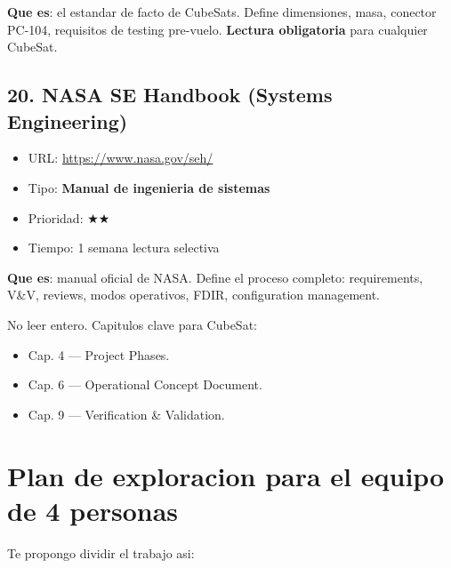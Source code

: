 \documentclass[11pt,a4paper,oneside]{report}
\begin{document}
\textbf{Que es}: el estandar de facto de CubeSats. Define dimensiones,
masa, conector PC-104, requisitos de testing pre-vuelo. \textbf{Lectura
obligatoria} para cualquier CubeSat.

\section{20. NASA SE Handbook (Systems Engineering)}

\begin{itemize}[leftmargin=1.5em]
  \item URL: \url{https://www.nasa.gov/seh/}
  \item Tipo: \textbf{Manual de ingenieria de sistemas}
  \item Prioridad: $\bigstar\bigstar$
  \item Tiempo: 1 semana lectura selectiva
\end{itemize}

\textbf{Que es}: manual oficial de NASA. Define el proceso completo:
requirements, V\&V, reviews, modos operativos, FDIR, configuration
management.

\begin{nota}
No leer entero. Capitulos clave para CubeSat:
\begin{itemize}[leftmargin=1em]
  \item Cap. 4 --- Project Phases.
  \item Cap. 6 --- Operational Concept Document.
  \item Cap. 9 --- Verification \& Validation.
\end{itemize}
\end{nota}

\chapter{Plan de exploracion para el equipo de 4 personas}

Te propongo dividir el trabajo asi:
\end{document}
